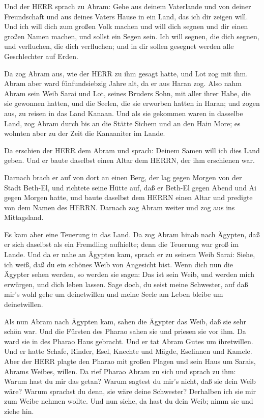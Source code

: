  Und der HERR sprach zu Abram: Gehe aus deinem Vaterlande
und von deiner Freundschaft und aus deines Vaters Hause in ein Land, das
ich dir zeigen will.  Und ich will dich zum großen Volk
machen und will dich segnen und dir einen großen Namen machen, und
sollst ein Segen sein.  Ich will segnen, die dich segnen,
und verfluchen, die dich verfluchen; und in dir sollen gesegnet werden
alle Geschlechter auf Erden.

 Da zog Abram aus, wie der HERR zu ihm gesagt hatte, und Lot
zog mit ihm. Abram aber ward fünfundsiebzig Jahre alt, da er aus Haran
zog.  Also nahm Abram sein Weib Sarai und Lot, seines
Bruders Sohn, mit aller ihrer Habe, die sie gewonnen hatten, und die
Seelen, die sie erworben hatten in Haran; und zogen aus, zu reisen in
das Land Kanaan. Und als sie gekommen waren in dasselbe Land,
 zog Abram durch bis an die Stätte Sichem und an den Hain
More; es wohnten aber zu der Zeit die Kanaaniter im Lande.

 Da erschien der HERR dem Abram und sprach: Deinem Samen
will ich dies Land geben. Und er baute daselbst einen Altar dem HERRN,
der ihm erschienen war.

 Darnach brach er auf von dort an einen Berg, der lag gegen
Morgen von der Stadt Beth-El, und richtete seine Hütte auf, daß er
Beth-El gegen Abend und Ai gegen Morgen hatte, und baute daselbst dem
HERRN einen Altar und predigte von dem Namen des HERRN. 
Darnach zog Abram weiter und zog aus ins Mittagsland.

 Es kam aber eine Teuerung in das Land. Da zog Abram hinab
nach Ägypten, daß er sich daselbst als ein Fremdling aufhielte; denn die
Teuerung war groß im Lande.  Und da er nahe an Ägypten kam,
sprach er zu seinem Weib Sarai: Siehe, ich weiß, daß du ein schönes Weib
von Angesicht bist.  Wenn dich nun die Ägypter sehen
werden, so werden sie sagen: Das ist sein Weib, und werden mich
erwürgen, und dich leben lassen.  Sage doch, du seist meine
Schwester, auf daß mir's wohl gehe um deinetwillen und meine Seele am
Leben bleibe um deinetwillen.

 Als nun Abram nach Ägypten kam, sahen die Ägypter das
Weib, daß sie sehr schön war.  Und die Fürsten des Pharao
sahen sie und priesen sie vor ihm. Da ward sie in des Pharao Haus
gebracht.  Und er tat Abram Gutes um ihretwillen. Und er
hatte Schafe, Rinder, Esel, Knechte und Mägde, Eselinnen und Kamele.
 Aber der HERR plagte den Pharao mit großen Plagen und sein
Haus um Sarais, Abrams Weibes, willen.  Da rief Pharao
Abram zu sich und sprach zu ihm: Warum hast du mir das getan? Warum
sagtest du mir's nicht, daß sie dein Weib wäre?  Warum
sprachst du denn, sie wäre deine Schwester? Derhalben ich sie mir zum
Weibe nehmen wollte. Und nun siehe, da hast du dein Weib; nimm sie und
ziehe hin.

